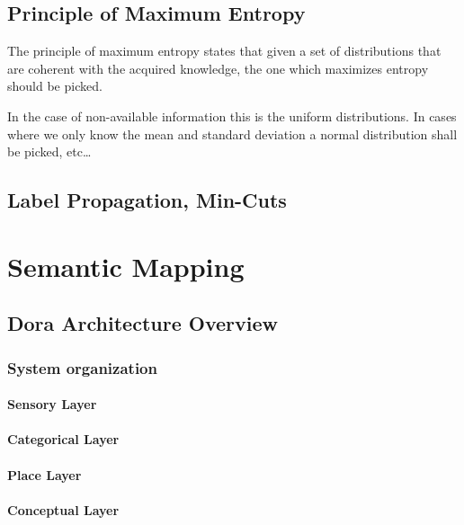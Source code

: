 \section{Principle of Maximum Entropy}
\label{sec:max-entropy}
The principle of maximum entropy states that given a set of distributions that
are coherent with the acquired knowledge, the one which maximizes entropy should
be picked.

In the case of non-available information this is the uniform distributions.
In cases where we only know the mean and standard deviation a normal
distribution shall be picked, etc\dots

\section{Label Propagation, Min-Cuts}



\chapter{Semantic Mapping}\label{chap:semantic-mapping}

% 

\section{Dora Architecture Overview}
\subsection{System organization}
\subsubsection{Sensory Layer}
\subsubsection{Categorical Layer}
\subsubsection{Place Layer}
\subsubsection{Conceptual Layer}

